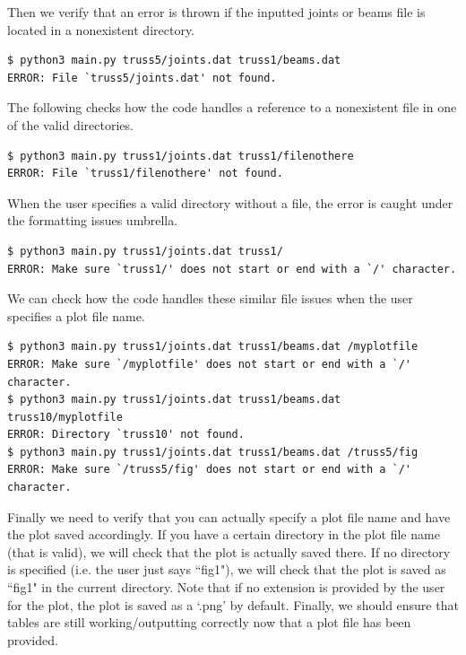 \documentclass[11pt]{amsart}
\theoremstyle{definition}
\begin{document}
Then we verify that an error is thrown if the inputted joints or beams file is located in a nonexistent directory.
\begin{Verbatim}[fontsize=\small]
$ python3 main.py truss5/joints.dat truss1/beams.dat
ERROR: File `truss5/joints.dat' not found.
\end{Verbatim}
The following checks how the code handles a reference to a nonexistent file in one of the valid directories.\begin{Verbatim}[fontsize=\small]
$ python3 main.py truss1/joints.dat truss1/filenothere
ERROR: File `truss1/filenothere' not found.
\end{Verbatim}
When the user specifies a valid directory without a file, the error is caught under the formatting issues umbrella.
\begin{Verbatim}[fontsize=\small]
$ python3 main.py truss1/joints.dat truss1/
ERROR: Make sure `truss1/' does not start or end with a `/' character.
\end{Verbatim}
We can check how the code handles these similar file issues when the user specifies a plot file name.
\begin{Verbatim}[fontsize=\small]
$ python3 main.py truss1/joints.dat truss1/beams.dat /myplotfile
ERROR: Make sure `/myplotfile' does not start or end with a `/' character.
$ python3 main.py truss1/joints.dat truss1/beams.dat truss10/myplotfile
ERROR: Directory `truss10' not found.
$ python3 main.py truss1/joints.dat truss1/beams.dat /truss5/fig
ERROR: Make sure `/truss5/fig' does not start or end with a `/' character.
\end{Verbatim}
Finally we need to verify that you can actually specify a plot file name and have the plot saved accordingly. If you have a certain directory in the plot file name (that is valid), we will check that the plot is actually saved there. If no directory is specified (i.e. the user just says ``fig1"), we will check that the plot is saved as ``fig1" in the current directory. Note that if no extension is provided by the user for the plot, the plot is saved as a `.png' by default. Finally, we should ensure that tables are still working/outputting correctly now that a plot file has been provided.
\end{document}
